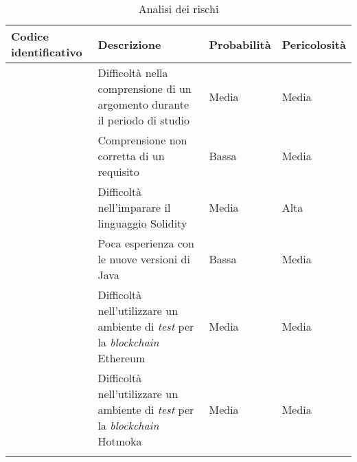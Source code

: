 \begin{longtabu}{|X[1,c]|X[2,c]|X[0.8,c,m]|X[0.8,c,m]|}

  \hline

  \textbf{Codice identificativo} & \textbf{Descrizione} & \textbf{Probabilità} & \textbf{Pericolosità} \\

  \hline

   \label{risk:non-comprensione-argomento} & Difficoltà nella comprensione di un argomento durante il periodo di studio & Media & Media \\

  \hline

   \label{risk:non-comprensione-requisito} & Comprensione non corretta di un requisito & Bassa & Media \\

  \hline

   \label{risk:solidity} & Difficoltà nell'imparare il linguaggio Solidity & Media & Alta \\

  \hline

   \label{risk:java} & Poca esperienza con le nuove versioni di Java & Bassa & Media \\

  \hline

   \label{risk:ethereum-test} & Difficoltà nell'utilizzare un ambiente di \textit{test} per la \textit{blockchain} Ethereum & Media & Media \\

  \hline

   \label{risk:hotmoka-test} & Difficoltà nell'utilizzare un ambiente di \textit{test} per la \textit{blockchain} Hotmoka & Media & Media \\

  \hline

  \caption{Analisi dei rischi}
\end{longtabu}
